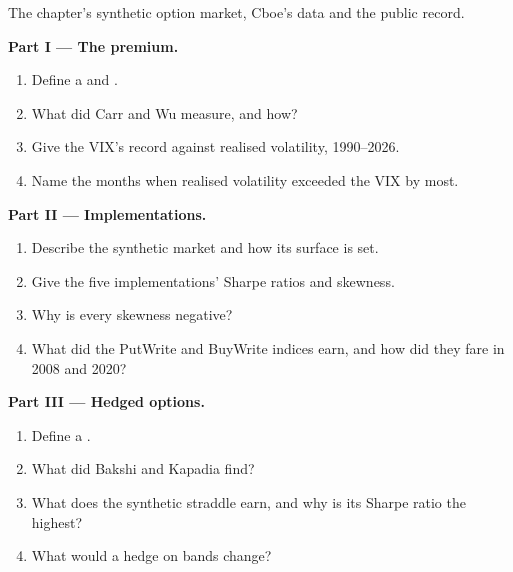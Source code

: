 \begin{problem}\label{pb:s2:harvesting-the-variance-risk-premium:1}
The chapter's synthetic option market, Cboe's data and the public record.

\medskip\noindent\textbf{Part I --- The premium.}
\begin{enumerate}
\item Define a  and .
\item What did Carr and Wu measure, and how?
\item Give the VIX's record against realised volatility, 1990--2026.
\item Name the months when realised volatility exceeded the VIX by most.
\end{enumerate}

\medskip\noindent\textbf{Part II --- Implementations.}
\begin{enumerate}[resume]
\item Describe the synthetic market and how its surface is set.
\item Give the five implementations' Sharpe ratios and skewness.
\item Why is every skewness negative?
\item What did the PutWrite and BuyWrite indices earn, and how did they fare in 2008 and 2020?
\end{enumerate}

\medskip\noindent\textbf{Part III --- Hedged options.}
\begin{enumerate}[resume]
\item Define a .
\item What did Bakshi and Kapadia find?
\item What does the synthetic straddle earn, and why is its Sharpe ratio the highest?
\item What would a hedge on bands change?
\end{enumerate}


\end{problem}
